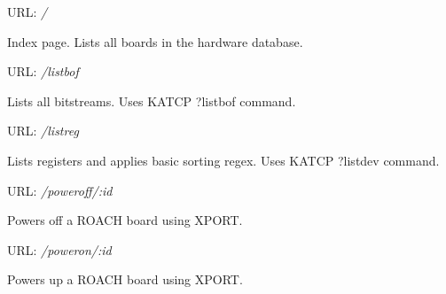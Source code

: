 \documentclass[letterpaper,10pt,english]{sphinxmanual}
\begin{document}

\begin{fulllineitems}
\label{index:roachnest.list_hardware}
URL: \emph{/}

Index page. Lists all boards in the hardware database.

\end{fulllineitems}



\begin{fulllineitems}
\label{index:roachnest.listbof}
URL: \emph{/listbof}

Lists all bitstreams. Uses KATCP ?listbof command.

\end{fulllineitems}



\begin{fulllineitems}
\label{index:roachnest.listreg}
URL: \emph{/listreg}

Lists registers and applies basic sorting regex. Uses KATCP ?listdev command.

\end{fulllineitems}



\begin{fulllineitems}
\label{index:roachnest.power_off}
URL: \emph{/poweroff/:id}

Powers off a ROACH board using XPORT.

\end{fulllineitems}



\begin{fulllineitems}
\label{index:roachnest.power_on}
URL: \emph{/poweron/:id}

Powers up a ROACH board using XPORT.

\end{fulllineitems}
\end{document}
